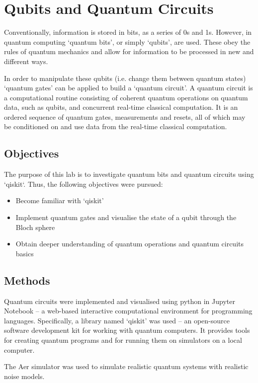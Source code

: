 \renewcommand{\chaptername}{March 8th: Lab}
\chapter{Qubits and Quantum Circuits}

Conventionally, information is stored in bits, as a series of 0s and 1s. However, in quantum computing `quantum bits', or simply `qubits', are used. These obey the rules of quantum mechanics and allow for information to be processed in new and different ways.

In order to manipulate these qubits (i.e. change them between quantum states) `quantum gates' can be applied to build a `quantum circuit'. A quantum circuit is a computational routine consisting of coherent quantum operations on quantum data, such as qubits, and concurrent real-time classical computation. It is an ordered sequence of quantum gates, measurements and resets, all of which may be conditioned on and use data from the real-time classical computation.

\section{Objectives}
The purpose of this lab is to investigate quantum bits and quantum circuits using `qiskit`. Thus, the following objectives were pursued:
\begin{itemize}
    \item Become familiar with `qiskit'
    \item Implement quantum gates and visualise the state of a qubit through the Bloch sphere
    \item Obtain deeper understanding of quantum operations and quantum circuits basics
\end{itemize}

\section{Methods}
Quantum circuits were implemented and visualised using python in Jupyter Notebook -- a web-based interactive computational environment for programming languages. Specifically, a library named `qiskit' was used -- an open-source software development kit for working with quantum computers. It provides tools for creating quantum programs and for running them on simulators on a local computer. 

The Aer simulator was used to simulate realistic quantum systems with realistic noise models.

